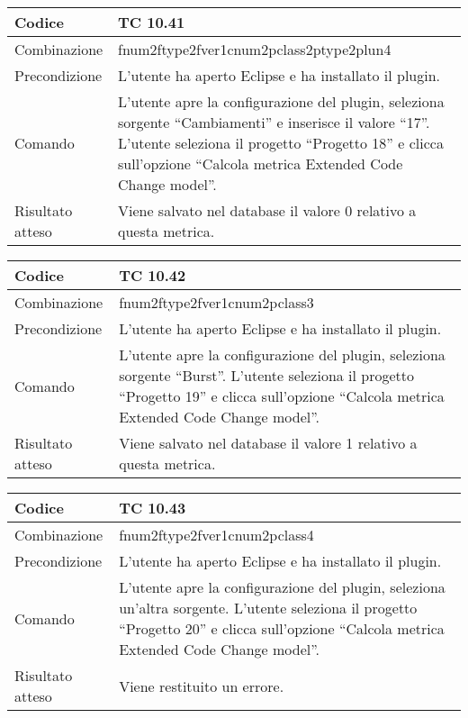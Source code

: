 \begin{table}[ht]
\begin{tabular}{|p{3cm}|p{9cm}|}
\hline
\cellcolor{lightgray}Codice				& TC 10.41								\\
\hline
\cellcolor{lightgray}Combinazione		& fnum2ftype2fver1cnum2pclass2ptype2plun4									\\
\hline
\cellcolor{lightgray}Precondizione		& L'utente ha aperto Eclipse e ha installato il plugin.		\\
\hline
\cellcolor{lightgray}Comando			& L'utente apre la configurazione del plugin, seleziona sorgente ``Cambiamenti'' e inserisce il valore ``17''. L'utente seleziona il progetto ``Progetto 18''  e clicca sull'opzione ``Calcola metrica Extended Code Change model''.	\\
\hline
\cellcolor{lightgray}Risultato atteso	& Viene salvato nel database il valore 0 relativo a questa metrica.\\
\hline
\end{tabular}
\end{table}

\begin{table}[ht]
\begin{tabular}{|p{3cm}|p{9cm}|}
\hline
\cellcolor{lightgray}Codice				& TC 10.42								\\
\hline
\cellcolor{lightgray}Combinazione		& fnum2ftype2fver1cnum2pclass3									\\
\hline
\cellcolor{lightgray}Precondizione		& L'utente ha aperto Eclipse e ha installato il plugin.		\\
\hline
\cellcolor{lightgray}Comando			& L'utente apre la configurazione del plugin, seleziona sorgente ``Burst''. L'utente seleziona il progetto ``Progetto 19''  e clicca sull'opzione ``Calcola metrica Extended Code Change model''.	\\
\hline
\cellcolor{lightgray}Risultato atteso	& Viene salvato nel database il valore 1 relativo a questa metrica.\\
\hline
\end{tabular}
\end{table}

\clearpage

\begin{table}[ht]
\begin{tabular}{|p{3cm}|p{9cm}|}
\hline
\cellcolor{lightgray}Codice				& TC 10.43								\\
\hline
\cellcolor{lightgray}Combinazione		& fnum2ftype2fver1cnum2pclass4									\\
\hline
\cellcolor{lightgray}Precondizione		& L'utente ha aperto Eclipse e ha installato il plugin.		\\
\hline
\cellcolor{lightgray}Comando			& L'utente apre la configurazione del plugin, seleziona un'altra sorgente. L'utente seleziona il progetto ``Progetto 20''  e clicca sull'opzione ``Calcola metrica Extended Code Change model''.	\\
\hline
\cellcolor{lightgray}Risultato atteso	& Viene restituito un errore.\\
\hline
\end{tabular}
\end{table}

